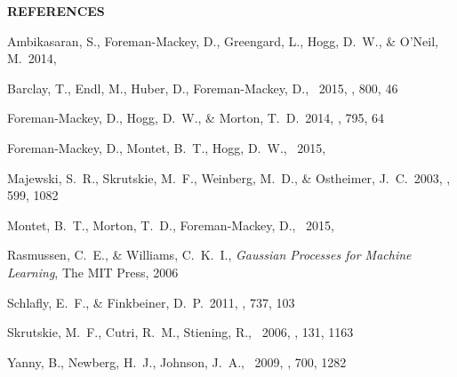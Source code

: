 \documentclass[letterpaper,12pt,preprint]{hack_aastex}
\begin{document}
\begin{multicols}{2}
{\centering\bf REFERENCES\par}
\vspace{0.2em}
\begin{thebibliography}{}%
\raggedright\raggedbottom\scriptsize\setlength{\parskip}{-0.5em}%

Ambikasaran, S., Foreman-Mackey, D., Greengard, L., Hogg, D.~W.,
\& O'Neil, M.\ 2014, 

Barclay, T., Endl, M., Huber, D., Foreman-Mackey, D., \etal\ 2015, \apj, 800,
46

Foreman-Mackey, D., Hogg, D.~W., \& Morton, T.~D.\ 2014, \apj, 795, 64

Foreman-Mackey, D., Montet, B.~T., Hogg, D.~W., \etal\ 2015, 

Majewski, S.~R., Skrutskie, M.~F., Weinberg, M.~D., \& Ostheimer, J.~C.\ 2003,
\apj, 599, 1082

Montet, B.~T., Morton, T.~D., Foreman-Mackey, D., \etal\ 2015,

Rasmussen, C.~E., \& Williams, C.~K.~I., \emph{Gaussian Processes for Machine
Learning}, The MIT Press, 2006

Schlafly, E.~F., \& Finkbeiner, D.~P.\ 2011, \apj, 737, 103

Skrutskie, M.~F., Cutri, R.~M., Stiening, R., \etal\ 2006, \aj, 131, 1163

Yanny, B., Newberg, H.~J., Johnson, J.~A., \etal\ 2009, \apj, 700, 1282

\end{thebibliography}
\end{multicols}
\end{document}
